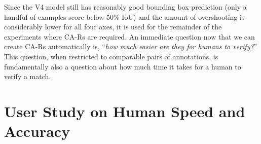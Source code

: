 Since the V4 model still has reasonably good bounding box prediction (only a handful of examples score below 50\% IoU) and the amount of overshooting is considerably lower for all four axes, it is used for the remainder of the experiments where CA-Rs are required.  An immediate question now that we can create CA-Rs automatically is, ``\textit{how much easier are they for humans to verify?}''  This question, when restricted to comparable pairs of annotations, is fundamentally also a question about how much time it takes for a human to verify a match.

\section{User Study on Human Speed and Accuracy} \label{sec:user-study}

